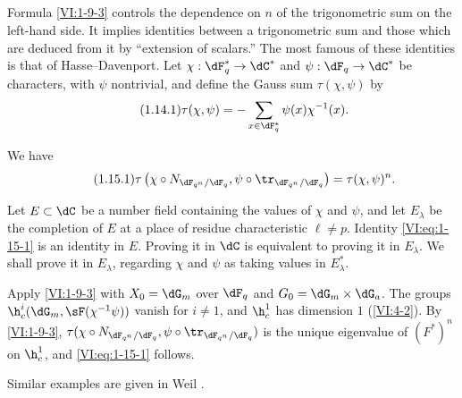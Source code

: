 \subsection{}\label{VI:1-14}

Formula \ref{VI:1-9-3} controls the dependence on $n$ of the trigonometric 
sum on the left-hand side. It implies identities between a 
trigonometric sum and those which are deduced from it by ``extension of 
scalars.'' The most famous of these identities is that of 
Hasse--Davenport. Let $\chi:\dF_q^\ast \to \dC^\ast$ and 
$\psi:\dF_q\to \dC^\ast$ be characters, with $\psi$ nontrivial, and 
define the Gauss sum $\tau(\chi,\psi)$ by 
\begin{equation*}\tag{1.14.1}\label{VI:eq:1-14-1}
  \tau(\chi,\psi) = - \sum_{x\in \dF_q^\ast} \psi(x) \chi^{-1}(x) \text{.}
\end{equation*}





\begin{theorem_}\label{VI:1-15}
We have 
\begin{equation*}\tag{1.15.1}\label{VI:eq:1-15-1}
  \tau\left(\chi\circ N_{\dF_{q^n}/\dF_q},\psi\circ \tr_{\dF_{q^n}/\dF_q}\right) = \tau(\chi,\psi)^n \text{.}
\end{equation*}
\end{theorem_}

Let $E\subset \dC$ be a number field containing the values of $\chi$ and 
$\psi$, and let $E_\lambda$ be the completion of $E$ at a place of residue 
characteristic $\ell\ne p$. Identity \eqref{VI:eq:1-15-1} is an identity in 
$E$. Proving it in $\dC$ is equivalent to proving it in $E_\lambda$. We 
shall prove it in $E_\lambda$, regarding $\chi$ and $\psi$ as taking values 
in $E_\lambda^\ast$.

Apply \ref{VI:1-9-3} with $X_0=\dG_m$ over $\dF_q$ and 
$G_0=\dG_m\times \dG_a$. The groups $\h_c^i(\dG_m,\sF(\chi^{-1}\psi))$ vanish for 
$i\ne 1$, and $\h_c^1$ has dimension $1$ (\ref{VI:4-2}). By 
\ref{VI:1-9-3}, 
$\tau(\chi\circ N_{\dF_{q^n}/\dF_q},\psi\circ \tr_{\dF_{q^n}/\dF_q})$ is 
the unique eigenvalue of $(F^\ast)^n$ on $\h_c^1$, and \eqref{VI:eq:1-15-1} 
follows. 

Similar examples are given in Weil \cite[App V, $3^\text{e}$ éd.]{we74}. 





\subsection{}\label{VI:1-16}

